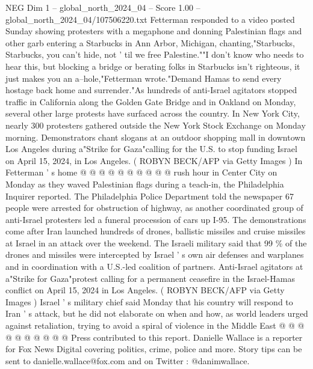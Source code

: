 \begin{textsample}{NEG Dim 1 – global\_north\_2024\_04 – Score 1.00 – global\_north\_2024\_04/107506220.txt}  \label{ex:f1_neg_258}
Fetterman responded to a video posted Sunday showing protesters with a megaphone and donning Palestinian flags and other garb entering a Starbucks in Ann Arbor, Michigan, chanting,"Starbucks, Starbucks, you can't hide, not ' til we free Palestine.""I don't know who needs to hear this, but blocking a bridge or berating folks in Starbucks isn't righteous, it just makes you an a--hole,"Fetterman wrote."Demand Hamas to send every hostage back home and surrender."As hundreds of anti-Israel agitators stopped traffic in California along the Golden Gate Bridge and in Oakland on Monday, several other large protests have surfaced across the country.
In New York City, nearly 300 protesters gathered outside the New York Stock Exchange on Monday morning.
Demonstrators chant slogans at an outdoor shopping mall in downtown Los Angeles during a"Strike for Gaza"calling for the U.S. to stop funding Israel on April 15, 2024, in Los Angeles. ( ROBYN BECK/AFP via Getty Images ) In Fetterman ' s home @ @ @ @ @ @ @ @ @ @ rush hour in Center City on Monday as they waved Palestinian flags during a teach-in, the Philadelphia Inquirer reported.
The Philadelphia Police Department told the newspaper 67 people were arrested for obstruction of highway, as another coordinated group of anti-Israel protesters led a funeral procession of cars up I-95.
The demonstrations come after Iran launched hundreds of drones, ballistic missiles and cruise missiles at Israel in an attack over the weekend.
The Israeli military said that 99 \% of the drones and missiles were intercepted by Israel ' s own air defenses and warplanes and in coordination with a U.S.-led coalition of partners.
Anti-Israel agitators at a"Strike for Gaza"protest calling for a permanent ceasefire in the Israel-Hamas conflict on April 15, 2024 in Los Angeles. ( ROBYN BECK/AFP via Getty Images ) Israel ' s military chief said Monday that his country will respond to Iran ' s attack, but he did not elaborate on when and how, as world leaders urged against retaliation, trying to avoid a spiral of violence in the Middle East @ @ @ @ @ @ @ @ @ @ Press contributed to this report.
Danielle Wallace is a reporter for Fox News Digital covering politics, crime, police and more.
Story tips can be sent to danielle.wallace@fox.com and on Twitter : @danimwallace.

\end{textsample}
